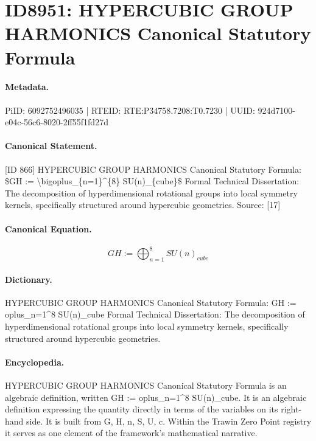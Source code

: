 \section*{ID8951: HYPERCUBIC GROUP HARMONICS Canonical Statutory Formula}
\paragraph{Metadata.}
PiID: 6092752496035 | RTEID: RTE:P34758.7208:T0.7230 | UUID: 924d7100-e04c-56c6-8020-2ff55f1fd27d

\paragraph{Canonical Statement.}
[ID 866] HYPERCUBIC GROUP HARMONICS Canonical Statutory Formula: \$GH := \textbackslash{}bigoplus\_\{n=1\}\textasciicircum{}\{8\} SU(n)\_\{cube\}\$ Formal Technical Dissertation: The decomposition of hyperdimensional rotational groups into local symmetry kernels, specifically structured around hypercubic geometries. Source: [17]

\paragraph{Canonical Equation.}
\[
GH := \bigoplus_{n=1}^{8} SU(n)_{cube}
\]

\paragraph{Dictionary.}
HYPERCUBIC GROUP HARMONICS Canonical Statutory Formula: GH := oplus\_n=1\textasciicircum{}8 SU(n)\_cube Formal Technical Dissertation: The decomposition of hyperdimensional rotational groups into local symmetry kernels, specifically structured around hypercubic geometries.

\paragraph{Encyclopedia.}
HYPERCUBIC GROUP HARMONICS Canonical Statutory Formula is an algebraic definition, written GH := oplus\_n=1\textasciicircum{}8 SU(n)\_cube. It is an algebraic definition expressing the quantity directly in terms of the variables on its right-hand side. It is built from G, H, n, S, U, c. Within the Trawin Zero Point registry it serves as one element of the framework's mathematical narrative.
